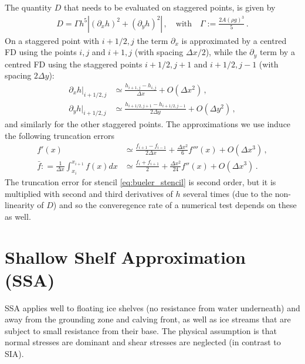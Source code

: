 \documentclass[11pt,a4paper]{article}
\newcommand{\p}{\partial}
\begin{document}
The quantity $D$ that needs to be evaluated on staggered points, is given by
\begin{align*}
    D = \Gamma h^5 |(\p_x h)^2 + (\p_y h)^2|
    \,, \quad
    \text{with}
    \quad
    \Gamma := \frac{2 A (\rho g)^3}{5}
    \,.
\end{align*}
On a staggered point with $i + 1/2,j$ the term $\p_x$ is approximated by a centred FD using the points $i,j$ and $i + 1,j$ (with spacing $\Delta x/2$), while the $\p_y$ term by a centred FD using the staggered points $i + 1/2, j + 1$ and $i + 1/2, j - 1$ (with spacing $2 \Delta y$):
\begin{align*}
    \p_x h|_{i+1/2,j}
    &\simeq
    \frac{h_{i+1,j}-h_{i,j}}{\Delta x} + O(\Delta x^2)
    \,,
    \\
    \p_y h|_{i+1/2,j}
    &\simeq
    \frac{h_{i+1/2,j+1}-h_{i+1/2,j-1}}{2 \Delta y} + O(\Delta y^2)
    \,,
\end{align*}
and similarly for the other staggered points. The approximations we use induce the following truncation errors
\begin{align*}
    f'(x) 
    &\simeq
    \frac{f_{i+1}-f_{i-1}}{2 \Delta x} + \frac{\Delta x ^2}{6} f'''(x) + O(\Delta x^3)
    \,,
    \\
    \bar{f} : = \frac{1}{\Delta x} \int_{x_i}^{x_{i+1}} f(x) dx
    & \simeq
    \frac{f_i + f_{i+1}}{2} + \frac{\Delta x^2}{24}f''(x) + O(\Delta x^3)
    \,.
\end{align*}
The truncation error for stencil \eqref{eq:bueler_stencil} is second order, but it is multiplied with second and third derivatives of $h$ several times (due to the non-linearity of $D$) and so the converegence rate of a numerical test depends on these as well.

\section{Shallow Shelf Approximation (SSA)}

SSA applies well to floating ice shelves (no resistance from water underneath) and away from the grounding zone and calving front, as well as ice streams that are subject to small resistance from their base. The physical assumption is that normal stresses are dominant and shear stresses are neglected (in contrast to SIA).
\end{document}
